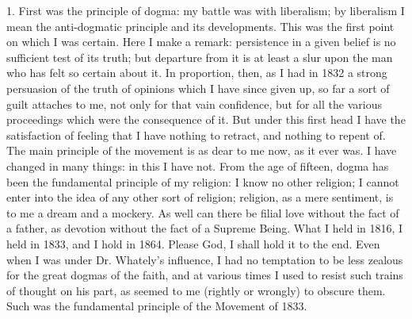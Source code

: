 1. First was the principle of dogma: my battle was with liberalism;
by liberalism I mean the anti-dogmatic principle and its developments.
This was the first point on which I was certain. Here I make a remark:
persistence in a given belief is no sufficient test of its truth; but
departure from it is at least a slur upon the man who has felt so
certain about it. In proportion, then, as I had in 1832 a strong
persuasion of the truth of opinions which I have since given up, so far a
sort of guilt attaches to me, not only for that vain confidence, but for all the various
proceedings which were the consequence of it. But under this first head I have the satisfaction of feeling that I have nothing to retract, and
nothing to repent of. The main principle of the movement is as
dear to me now, as it ever was. I have changed in many things: in this I
have not. From the age of fifteen, dogma has been the fundamental
principle of my religion: I know no other religion; I cannot enter into
the idea of any other sort of religion; religion, as a mere sentiment,
is to me a dream and a mockery. As well can there be filial love without
the fact of a father, as devotion without the fact of a Supreme Being.
What I held in 1816, I held in 1833, and I hold in 1864. Please God, I
shall hold it to the end. Even when I was under Dr. Whately's influence,
I had no temptation to be less zealous for the great dogmas of the
faith, and at various times I used to resist such trains of
thought on his part, as seemed to me (rightly or wrongly) to obscure
them. Such was the fundamental principle of the Movement of 1833.

